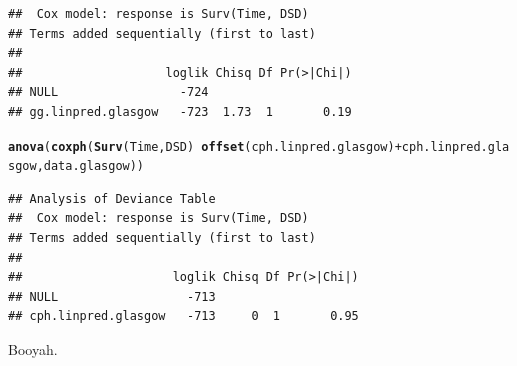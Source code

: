 \documentclass{article}\usepackage[]{graphicx}\usepackage[]{color}
\makeatletter
\newcommand{\hlopt}[1]{\textcolor[rgb]{0,0,0}{#1}}%
\newcommand{\hlstd}[1]{\textcolor[rgb]{0.345,0.345,0.345}{#1}}%
\newcommand{\hlkwd}[1]{\textcolor[rgb]{0.737,0.353,0.396}{\textbf{#1}}}%
\newenvironment{kframe}{%
 \def\at@end@of@kframe{}%
 \ifinner\ifhmode%
  \def\at@end@of@kframe{\end{minipage}}%
  \begin{minipage}{\columnwidth}%
 \fi\fi%
 \def\FrameCommand##1{\hskip\@totalleftmargin \hskip-\fboxsep
 \colorbox{shadecolor}{##1}\hskip-\fboxsep
     \hskip-\linewidth \hskip-\@totalleftmargin \hskip\columnwidth}%
 \MakeFramed {\advance\hsize-\width
   \@totalleftmargin\z@ \linewidth\hsize
   \@setminipage}}%
 {\par\unskip\endMakeFramed%
 \at@end@of@kframe}
\newenvironment{knitrout}{}{} %
\makeatother
\begin{document}
\begin{knitrout}
\begin{kframe}
\begin{verbatim}
##  Cox model: response is Surv(Time, DSD)
## Terms added sequentially (first to last)
## 
##                    loglik Chisq Df Pr(>|Chi|)
## NULL                 -724                    
## gg.linpred.glasgow   -723  1.73  1       0.19
\end{verbatim}
\begin{alltt}
\hlkwd{anova}\hlstd{(}\hlkwd{coxph}\hlstd{(}\hlkwd{Surv}\hlstd{(Time, DSD)} \hlopt{~} \hlkwd{offset}\hlstd{(cph.linpred.glasgow)} \hlopt{+} \hlstd{cph.linpred.glasgow, data.glasgow))}
\end{alltt}
\begin{verbatim}
## Analysis of Deviance Table
##  Cox model: response is Surv(Time, DSD)
## Terms added sequentially (first to last)
## 
##                     loglik Chisq Df Pr(>|Chi|)
## NULL                  -713                    
## cph.linpred.glasgow   -713     0  1       0.95
\end{verbatim}
\end{kframe}
\end{knitrout}
Booyah.
\end{document}
